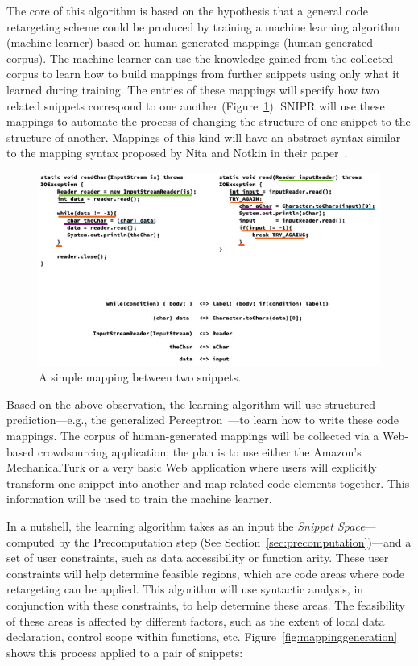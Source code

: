 The core of this algorithm is based on the hypothesis that a general code retargeting scheme could be produced by training a machine learning algorithm (machine learner) based on human-generated mappings (human-generated corpus). The machine learner can use the knowledge gained from the collected corpus to learn how to build mappings from further snippets using only what it learned during training. The entries of these mappings will specify how two related snippets correspond to one another (Figure~\ref{fig:mappings}). SNIPR will use these mappings to automate the process of changing the structure of one snippet to the structure of another. Mappings of this kind will have an abstract syntax similar to the mapping syntax proposed by Nita and Notkin in their paper~\cite{Nita:2010en}.

\begin{figure}[!ht]
    \centering
    \includegraphics[width=\textwidth]{images/mappings}
    \caption{A simple mapping between two snippets.}
    \label{fig:mappings}
\end{figure}

Based on the above observation, the learning algorithm will use structured prediction---e.g., the generalized Perceptron~\cite{Collins:2002uo}---to learn how to write these code mappings. The corpus of human-generated mappings will be collected via a Web-based crowdsourcing application; the plan is to use either the Amazon's MechanicalTurk or a very basic Web application where users will explicitly transform one snippet into another and map related code elements together. This information will be used to train the machine learner.

In a nutshell, the learning algorithm takes as an input the \emph{Snippet Space}---computed by the Precomputation step (See Section~\ref{sec:precomputation})---and a set of user constraints, such as data accessibility or function arity. These user constraints will help determine feasible regions, which are code areas where code retargeting can be applied. This algorithm will use syntactic analysis, in conjunction with these constraints, to help determine these areas. The feasibility of these areas is affected by different factors, such as the extent of local data declaration, control scope within functions, etc. Figure~\ref{fig:mappinggeneration} shows this process applied to a pair of snippets:

